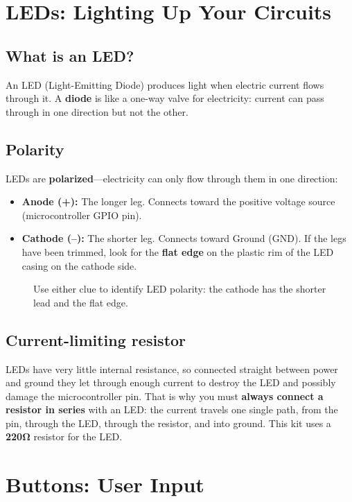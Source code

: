 \section{LEDs: Lighting Up Your Circuits}

\subsection{What is an LED?}
An LED (Light-Emitting Diode) produces light when electric current flows through it. A
\textbf{diode} is like a one-way valve for electricity: current can pass through in one direction
but not the other.

\subsection{Polarity}
LEDs are \textbf{polarized}---electricity can only flow through them in one direction:
\begin{itemize}
    \item \textbf{Anode (+):} The longer leg. Connects toward the positive voltage source (microcontroller GPIO pin).
    \item \textbf{Cathode (--):} The shorter leg. Connects toward Ground (GND). If the legs have been trimmed, look for the \textbf{flat edge} on the plastic rim of the LED casing on the cathode side.
\end{itemize}

\begin{figure}[H]
\centering
{}
\caption{Use either clue to identify LED polarity: the cathode has the shorter lead and the flat edge.}
\label{fig:led_polarity}
\end{figure}

\subsection{Current-limiting resistor}
LEDs have very little internal resistance, so connected straight between power and ground they let
through enough current to destroy the LED and possibly damage the microcontroller pin. That is why
you must \textbf{always connect a resistor in series} with an LED: the current travels one single
path, from the pin, through the LED, through the resistor, and into ground. This kit uses a
\textbf{220\si{\ohm}} resistor for the LED.


\section{Buttons: User Input} \label{button_basics}

